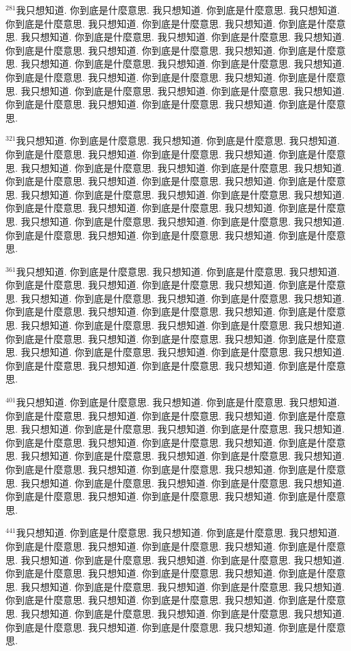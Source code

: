 \documentclass{book}
\begin{document}
$^{281}$我只想知道.
你到底是什麼意思.
我只想知道.
你到底是什麼意思.
我只想知道.
你到底是什麼意思.
我只想知道.
你到底是什麼意思.
我只想知道.
你到底是什麼意思.
我只想知道.
你到底是什麼意思.
我只想知道.
你到底是什麼意思.
我只想知道.
你到底是什麼意思.
我只想知道.
你到底是什麼意思.
我只想知道.
你到底是什麼意思.
我只想知道.
你到底是什麼意思.
我只想知道.
你到底是什麼意思.
我只想知道.
你到底是什麼意思.
我只想知道.
你到底是什麼意思.
我只想知道.
你到底是什麼意思.
我只想知道.
你到底是什麼意思.
我只想知道.
你到底是什麼意思.
我只想知道.
你到底是什麼意思.
我只想知道.
你到底是什麼意思.
我只想知道.
你到底是什麼意思.

$^{321}$我只想知道.
你到底是什麼意思.
我只想知道.
你到底是什麼意思.
我只想知道.
你到底是什麼意思.
我只想知道.
你到底是什麼意思.
我只想知道.
你到底是什麼意思.
我只想知道.
你到底是什麼意思.
我只想知道.
你到底是什麼意思.
我只想知道.
你到底是什麼意思.
我只想知道.
你到底是什麼意思.
我只想知道.
你到底是什麼意思.
我只想知道.
你到底是什麼意思.
我只想知道.
你到底是什麼意思.
我只想知道.
你到底是什麼意思.
我只想知道.
你到底是什麼意思.
我只想知道.
你到底是什麼意思.
我只想知道.
你到底是什麼意思.
我只想知道.
你到底是什麼意思.
我只想知道.
你到底是什麼意思.
我只想知道.
你到底是什麼意思.
我只想知道.
你到底是什麼意思.

$^{361}$我只想知道.
你到底是什麼意思.
我只想知道.
你到底是什麼意思.
我只想知道.
你到底是什麼意思.
我只想知道.
你到底是什麼意思.
我只想知道.
你到底是什麼意思.
我只想知道.
你到底是什麼意思.
我只想知道.
你到底是什麼意思.
我只想知道.
你到底是什麼意思.
我只想知道.
你到底是什麼意思.
我只想知道.
你到底是什麼意思.
我只想知道.
你到底是什麼意思.
我只想知道.
你到底是什麼意思.
我只想知道.
你到底是什麼意思.
我只想知道.
你到底是什麼意思.
我只想知道.
你到底是什麼意思.
我只想知道.
你到底是什麼意思.
我只想知道.
你到底是什麼意思.
我只想知道.
你到底是什麼意思.
我只想知道.
你到底是什麼意思.
我只想知道.
你到底是什麼意思.

$^{401}$我只想知道.
你到底是什麼意思.
我只想知道.
你到底是什麼意思.
我只想知道.
你到底是什麼意思.
我只想知道.
你到底是什麼意思.
我只想知道.
你到底是什麼意思.
我只想知道.
你到底是什麼意思.
我只想知道.
你到底是什麼意思.
我只想知道.
你到底是什麼意思.
我只想知道.
你到底是什麼意思.
我只想知道.
你到底是什麼意思.
我只想知道.
你到底是什麼意思.
我只想知道.
你到底是什麼意思.
我只想知道.
你到底是什麼意思.
我只想知道.
你到底是什麼意思.
我只想知道.
你到底是什麼意思.
我只想知道.
你到底是什麼意思.
我只想知道.
你到底是什麼意思.
我只想知道.
你到底是什麼意思.
我只想知道.
你到底是什麼意思.
我只想知道.
你到底是什麼意思.

$^{441}$我只想知道.
你到底是什麼意思.
我只想知道.
你到底是什麼意思.
我只想知道.
你到底是什麼意思.
我只想知道.
你到底是什麼意思.
我只想知道.
你到底是什麼意思.
我只想知道.
你到底是什麼意思.
我只想知道.
你到底是什麼意思.
我只想知道.
你到底是什麼意思.
我只想知道.
你到底是什麼意思.
我只想知道.
你到底是什麼意思.
我只想知道.
你到底是什麼意思.
我只想知道.
你到底是什麼意思.
我只想知道.
你到底是什麼意思.
我只想知道.
你到底是什麼意思.
我只想知道.
你到底是什麼意思.
我只想知道.
你到底是什麼意思.
我只想知道.
你到底是什麼意思.
我只想知道.
你到底是什麼意思.
我只想知道.
你到底是什麼意思.
我只想知道.
你到底是什麼意思.
\end{document}
